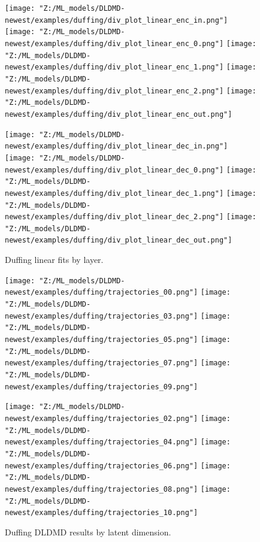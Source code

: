 \begin{figure}[!htbp]
    \centering
    \begin{minipage}{.5\textwidth}
        \texttt{[image: "Z:/ML\_models/DLDMD-newest/examples/duffing/div\_plot\_linear\_enc\_in.png"]} 
        \texttt{[image: "Z:/ML\_models/DLDMD-newest/examples/duffing/div\_plot\_linear\_enc\_0.png"]} 
        \texttt{[image: "Z:/ML\_models/DLDMD-newest/examples/duffing/div\_plot\_linear\_enc\_1.png"]} 
        \texttt{[image: "Z:/ML\_models/DLDMD-newest/examples/duffing/div\_plot\_linear\_enc\_2.png"]} 
        \texttt{[image: "Z:/ML\_models/DLDMD-newest/examples/duffing/div\_plot\_linear\_enc\_out.png"]} 
    \end{minipage}%
    \begin{minipage}{.5\textwidth}
        \texttt{[image: "Z:/ML\_models/DLDMD-newest/examples/duffing/div\_plot\_linear\_dec\_in.png"]} 
        \texttt{[image: "Z:/ML\_models/DLDMD-newest/examples/duffing/div\_plot\_linear\_dec\_0.png"]} 
        \texttt{[image: "Z:/ML\_models/DLDMD-newest/examples/duffing/div\_plot\_linear\_dec\_1.png"]} 
        \texttt{[image: "Z:/ML\_models/DLDMD-newest/examples/duffing/div\_plot\_linear\_dec\_2.png"]} 
        \texttt{[image: "Z:/ML\_models/DLDMD-newest/examples/duffing/div\_plot\_linear\_dec\_out.png"]} 
    \end{minipage}
    \caption{Duffing linear fits by layer.}
    \label{fig:duffing linear fits all layers}
\end{figure}

\begin{figure}[!htbp]
    \centering
    \begin{minipage}{.5\textwidth}
        \texttt{[image: "Z:/ML\_models/DLDMD-newest/examples/duffing/trajectories\_00.png"]} 
        \texttt{[image: "Z:/ML\_models/DLDMD-newest/examples/duffing/trajectories\_03.png"]} 
        \texttt{[image: "Z:/ML\_models/DLDMD-newest/examples/duffing/trajectories\_05.png"]} 
        \texttt{[image: "Z:/ML\_models/DLDMD-newest/examples/duffing/trajectories\_07.png"]} 
        \texttt{[image: "Z:/ML\_models/DLDMD-newest/examples/duffing/trajectories\_09.png"]} 
    \end{minipage}%
    \begin{minipage}{.5\textwidth}
        \texttt{[image: "Z:/ML\_models/DLDMD-newest/examples/duffing/trajectories\_02.png"]} 
        \texttt{[image: "Z:/ML\_models/DLDMD-newest/examples/duffing/trajectories\_04.png"]} 
        \texttt{[image: "Z:/ML\_models/DLDMD-newest/examples/duffing/trajectories\_06.png"]} 
        \texttt{[image: "Z:/ML\_models/DLDMD-newest/examples/duffing/trajectories\_08.png"]} 
        \texttt{[image: "Z:/ML\_models/DLDMD-newest/examples/duffing/trajectories\_10.png"]} 
    \end{minipage}
    \caption{Duffing DLDMD results by latent dimension.}
    \label{fig:duffing DLDMD results}
\end{figure}

